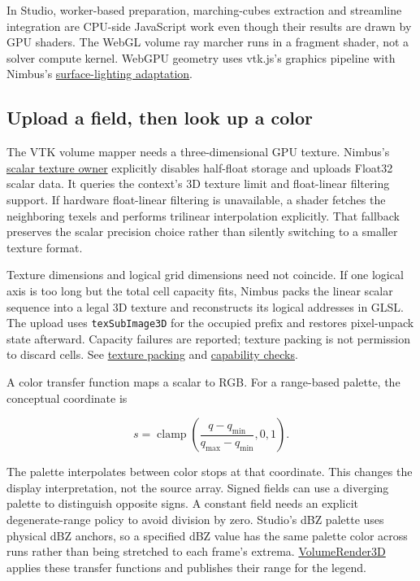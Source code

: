 \documentclass[
  11pt,
]{article}
\begin{document}
In Studio, worker-based preparation, marching-cubes extraction and
streamline integration are CPU-side JavaScript work even though their
results are drawn by GPU shaders. The WebGL volume ray marcher runs in a
fragment shader, not a solver compute kernel. WebGPU geometry uses
vtk.js's graphics pipeline with Nimbus's
\href{../ui/src/lib/vtk/vtkWebGpuSurfaceLighting.ts}{surface-lighting
adaptation}.

\subsection{Upload a field, then look up a
color}\label{upload-a-field-then-look-up-a-color}

The VTK volume mapper needs a three-dimensional GPU texture. Nimbus's
\href{../ui/src/lib/vtk/volumeScalarSampling.ts}{scalar texture owner}
explicitly disables half-float storage and uploads Float32 scalar data.
It queries the context's 3D texture limit and float-linear filtering
support. If hardware float-linear filtering is unavailable, a shader
fetches the neighboring texels and performs trilinear interpolation
explicitly. That fallback preserves the scalar precision choice rather
than silently switching to a smaller texture format.

Texture dimensions and logical grid dimensions need not coincide. If one
logical axis is too long but the total cell capacity fits, Nimbus packs
the linear scalar sequence into a legal 3D texture and reconstructs its
logical addresses in GLSL. The upload uses \texttt{texSubImage3D} for
the occupied prefix and restores pixel-unpack state afterward. Capacity
failures are reported; texture packing is not permission to discard
cells. See \href{../ui/src/lib/vtk/volumeTexturePacking.ts}{texture
packing} and
\href{../ui/src/lib/vtk/volumeTextureCapabilities.ts}{capability
checks}.

A color transfer function maps a scalar to RGB. For a range-based
palette, the conceptual coordinate is

\[s=\operatorname{clamp}\!\left(\frac{q-q_{\min}}{q_{\max}-q_{\min}},0,1\right).\]

The palette interpolates between color stops at that coordinate. This
changes the display interpretation, not the source array. Signed fields
can use a diverging palette to distinguish opposite signs. A constant
field needs an explicit degenerate-range policy to avoid division by
zero. Studio's dBZ palette uses physical dBZ anchors, so a specified dBZ
value has the same palette color across runs rather than being stretched
to each frame's extrema.
\href{../ui/src/components/plots/VolumeRender3D.tsx}{VolumeRender3D}
applies these transfer functions and publishes their range for the
legend.
\end{document}
